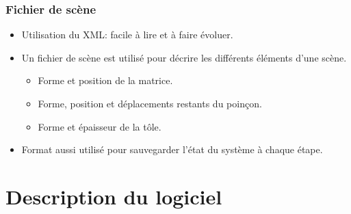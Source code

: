 \documentclass{beamer}
\begin{document}
\begin{frame}
    \frametitle{Fichier de scène}
    \begin{itemize}
        \item Utilisation du XML: facile à lire et à faire évoluer.
        \item Un fichier de scène est utilisé pour décrire les différents éléments d'une scène.
            \begin{itemize}
                \item Forme et position de la matrice.
                \item Forme, position et déplacements restants du poinçon.
                \item Forme et épaisseur de la tôle.
            \end{itemize}
        \item Format aussi utilisé pour sauvegarder l'état du système à chaque étape.
    \end{itemize}
\end{frame}

\section{Description du logiciel}
\end{document}
